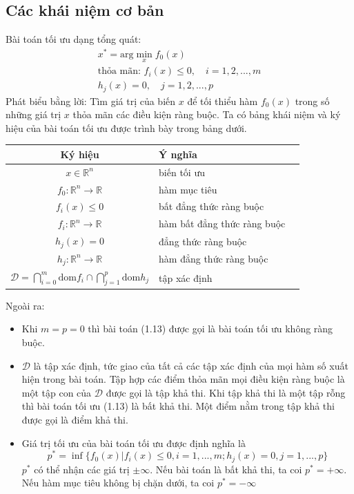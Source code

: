 \documentclass[12pt,a4paper]{report}
\begin{document}
	\subsection{Các khái niệm cơ bản}
	Bài toán tối ưu dạng tổng quát: \begin{eqnarray}
		x^* = \text{arg} \min_x f_0(x)\\\text{thỏa mãn: } f_i(x) \leq 0, \quad i = 1,2,...,m \nonumber\\h_j(x) = 0, \quad j = 1,2,..., p \nonumber
	\end{eqnarray}
	Phát biểu bằng lời: Tìm giá trị của biến $x$ để tối thiểu hàm $f_0(x)$ trong số những giá trị $x$ thỏa mãn các điều kiện ràng buộc. Ta có bảng khái niệm và ký hiệu của bài toán tối ưu được trình bày trong bảng dưới.
	\begin{center}
		\begin{tabular}{|c|l|l|}
			\hline
			\textbf{Ký hiệu}& \textbf{Ý nghĩa } \\
			\hline
			$x \in \mathbb{R}^n$ & biến tối ưu \\
			\hline
			$f_0: \mathbb{R}^n \to \mathbb{R}$ &hàm mục tiêu \\
			\hline
			$f_i(x) \leq 0$& bất đẳng thức ràng buộc \\
			\hline
			$f_i: \mathbb{R}^n \to \mathbb{R}$& hàm bất đẳng thức ràng buộc \\
			\hline
			$h_j(x) = 0$& đẳng thức ràng buộc \\
			\hline
			$h_j: \mathbb{R}^n \to \mathbb{R}$& hàm đẳng thức ràng buộc \\
			\hline
			$\mathcal{D} = \bigcap_{i=0}^m\text{dom}f_i \cap \bigcap_{j=1}^p\text{dom}h_j$& tập xác định\\
			\hline
		\end{tabular}
		
	\end{center}
	Ngoài ra:
	\begin{itemize}
		\item Khi $m = p = 0$ thì bài toán (1.13) được gọi là bài toán tối ưu không ràng buộc.
		\item $\mathcal{D}$ là tập xác định, tức giao của tất cả các tập xác định của mọi hàm số xuất hiện trong bài toán. Tập hợp các điểm thỏa mãn mọi điều kiện ràng buộc là một tập con của $\mathcal{D}$ được gọi là tập khả thi. Khi tập khả thi là một tập rỗng thì bài toán tối ưu (1.13) là bất khả thi. Một điểm nằm trong tập khả thi được gọi là điểm khả thi.
		\item Giá trị tối ưu của bài toán tối ưu được định nghĩa là $$p^* = \inf\{f_0(x)|f_i(x) \leq 0, i = 1, ..., m; h_j(x) = 0, j=1,..., p\}$$
		$p^*$ có thể nhận các giá trị $\pm \infty$. Nếu bài toán là bất khả thi, ta coi $p^* = + \infty$. Nếu hàm mục tiêu không bị chặn dưới, ta coi $p^* = -\infty$
	\end{itemize}
\end{document}
